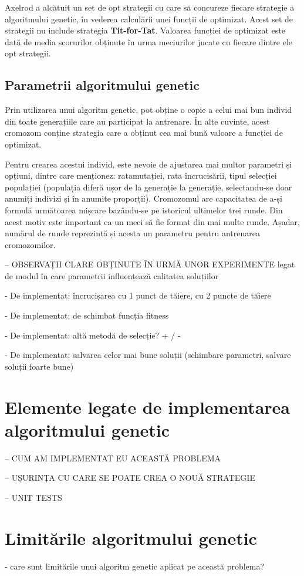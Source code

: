 Axelrod a alcătuit un set de opt strategii cu care să concureze fiecare strategie a algoritmului genetic, în vederea calculării unei funcții de optimizat. Acest set de strategii nu include strategia \textbf{Tit-for-Tat}. Valoarea funcției de optimizat este dată de media scorurilor obținute în urma meciurilor jucate cu fiecare dintre ele opt strategii.

\subsection {Parametrii algoritmului genetic}

Prin utilizarea unui algoritm genetic, pot obține o copie a celui mai bun individ din toate generațiile care au participat la antrenare. În alte cuvinte, acest cromozom conține strategia care a obținut cea mai bună valoare a funcției de optimizat. 

Pentru crearea acestui individ, este nevoie de ajustarea mai multor parametri și opțiuni, dintre care menționez: ratamutației, rata încrucisării, tipul selecției populației (populația diferă ușor de la generație la generație, selectandu-se doar anumiți indivizi și în anumite proporții). Cromozomul are capacitatea de a-și formulă următoarea mișcare bazându-se pe istoricul ultimelor trei runde. Din acest motiv este important ca un meci să fie format din mai multe runde. Așadar, numărul de runde reprezintă și acesta un parametru pentru antrenarea cromozomilor. 

-- OBSERVAȚII CLARE OBȚINUTE ÎN URMĂ UNOR EXPERIMENTE legat de modul în care parametrii influențează calitatea soluțiilor

- De implementat: încrucișarea cu 1 punct de tăiere, cu 2 puncte de tăiere

- De implementat: de schimbat funcția fitness

- De implementat: altă metodă de selecție? + / -

- De implementat: salvarea celor mai bune soluții (schimbare parametri, salvare soluții foarte bune)

\section {Elemente legate de implementarea algoritmului genetic}

-- CUM AM IMPLEMENTAT EU ACEASTĂ PROBLEMA

-- UȘURINȚA CU CARE SE POATE CREA O NOUĂ STRATEGIE

-- UNIT TESTS

\section {Limitările algoritmului genetic}

- care sunt limitările unui algoritm genetic aplicat pe această problema?